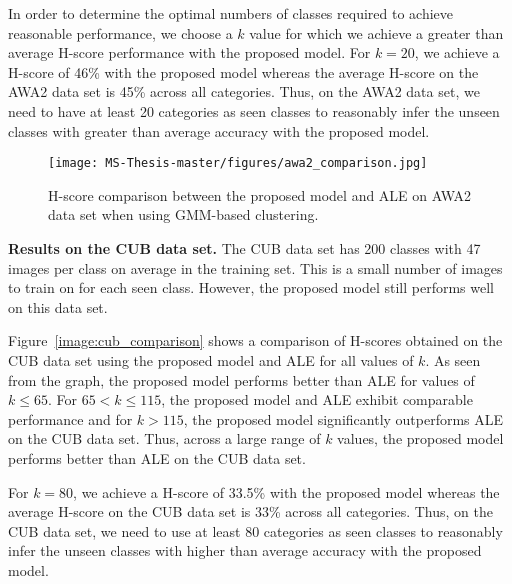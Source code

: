 \par
\medskip

In order to determine the optimal numbers of classes required to achieve reasonable performance, we choose a $k$ value for which we achieve a greater than average H-score performance with the proposed model. For $k = 20$, we achieve a H-score of 46\% with the proposed model whereas the average H-score on the AWA2 data set is 45\% across all categories. Thus, on the AWA2 data set, we need to have at least 20 categories as seen classes to reasonably infer the unseen classes with greater than average accuracy with the proposed model.

\par
\medskip

\begin{figure}[h]
\centering
\texttt{[image: MS-Thesis-master/figures/awa2\_comparison.jpg]}
\caption{H-score comparison between the proposed model and ALE on AWA2 data set when using GMM-based clustering.}
\label{image:awa2_comparison}
\end{figure}

\par
\medskip
\noindent
\textbf{Results on the CUB data set.} The CUB data set has 200 classes with 47 images per class on average in the training set. This is a small number of images to train on for each seen class. However, the proposed model still performs well on this data set. 

\par
\medskip

Figure~\ref{image:cub_comparison} shows a comparison of H-scores obtained on the CUB data set using the proposed model and ALE for all values of $k$. As seen from the graph, the proposed model performs better than ALE for values of $k \leq 65$. For $65 < k \leq 115$, the proposed model and ALE exhibit comparable performance and for $k > 115$, the proposed model significantly outperforms ALE on the CUB data set. Thus, across a large range of $k$ values, the proposed model performs better than ALE on the CUB data set. 

\par
\medskip

For $k = 80$, we achieve a H-score of 33.5\% with the proposed model whereas the average H-score on the CUB data set is 33\% across all categories. Thus, on the CUB data set, we need to use at least 80 categories as seen classes to reasonably infer the unseen classes with higher than average accuracy with the proposed model.

